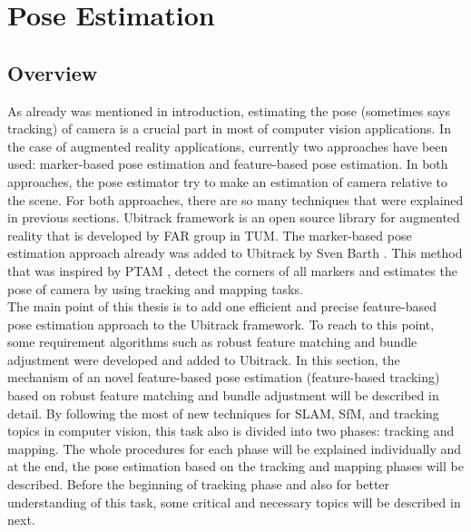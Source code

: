 \chapter{Pose Estimation}\label{chapter:Pose Estimation}
\section{Overview}\label{sec:pose_estimation_overview}
As already was mentioned in introduction, estimating the pose (sometimes says tracking) of camera is a crucial part in most of computer vision applications. In the case of augmented reality applications, currently two approaches have been used: marker-based pose estimation and feature-based pose estimation. In both approaches, the pose estimator try to make an estimation of camera relative to the scene. For both approaches, there are so many techniques that were explained in previous sections. Ubitrack framework is an open source library for augmented reality that is developed by FAR group in TUM. The marker-based pose estimation approach already was added to Ubitrack by Sven Barth \cite{barth2014marker}. This method that was inspired by PTAM \cite{klein2007parallel}, detect the corners of all markers and estimates the pose of camera by using tracking and mapping tasks.\\
The main point of this thesis is to add one efficient and precise feature-based pose estimation approach to the Ubitrack framework. To reach to this point, some requirement algorithms such as robust feature matching and bundle adjustment were developed and added to Ubitrack. In this section, the mechanism of an novel feature-based pose estimation (feature-based tracking) based on robust feature matching and bundle adjustment will be described in detail. By following the most of new techniques for SLAM, SfM, and tracking topics in computer vision, this task also is divided into two phases: tracking and mapping. The whole procedures for each phase will be explained individually and at the end, the pose estimation based on the tracking and mapping phases will be described. Before the beginning of tracking phase and also for better understanding of this task, some critical and necessary topics will be described in next.

